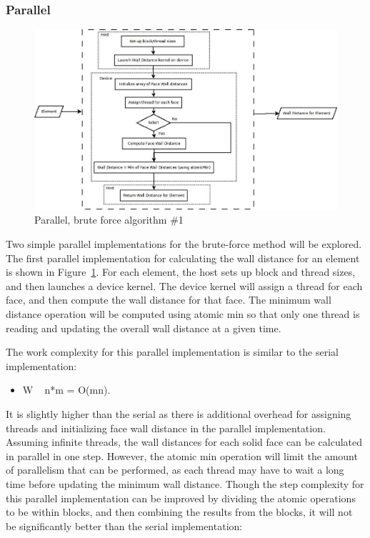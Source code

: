 \documentclass[]{aiaa-tc}%
\begin{document}
\subsubsection{Parallel}

\begin{figure}
  \includegraphics{figures/brute_force/bf_parallel1_block}
  \caption{Parallel, brute force algorithm \#1}
  \label{f:bf_parallel1}
\end{figure}

Two simple parallel implementations for the brute-force method will be explored.  The first parallel implementation for calculating the wall distance for an element is shown in Figure~\ref{f:bf_parallel1}.  For each element, the host sets up block and thread sizes, and then launches a device kernel.  The device kernel will assign a thread for each face, and then compute the wall distance for that face.  The minimum wall distance operation will be computed using atomic min so that only one thread is reading and updating the overall wall distance at a given time. 

The work complexity for this parallel implementation is similar to the
serial implementation:

\begin{itemize}
  \item W ~ n*m = O(mn).
\end{itemize}

It is slightly higher than the serial as there is additional overhead for assigning threads and initializing face wall distance in the parallel implementation.
Assuming infinite threads, the wall distances for each solid face can be calculated in parallel in one step.  However, the atomic min operation will limit the amount of parallelism that can be performed, as each thread may have to wait a long time before updating the minimum wall distance.  Though the step complexity for this parallel implementation can be improved by dividing the atomic operations to be within blocks, and then combining the results from the blocks, it will not be significantly better than the serial implementation:
\end{document}
